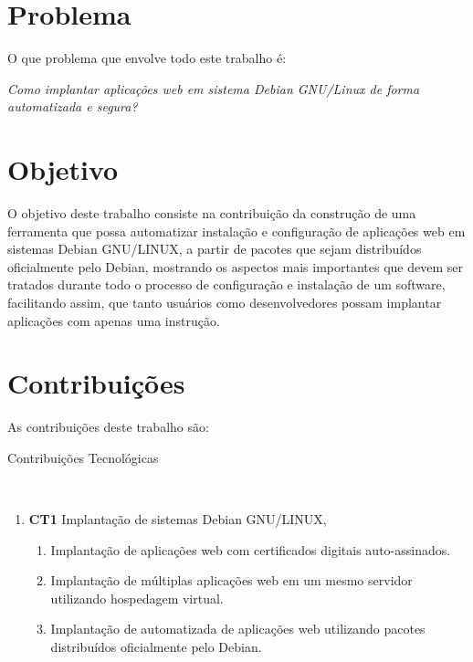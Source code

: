 \section{Problema}

O que problema que envolve todo este trabalho é:

\begin{center}
  \textit{
  Como implantar aplicações web em sistema Debian GNU/Linux de forma automatizada
  e segura?
}
\end{center}

\section{Objetivo}

O objetivo deste trabalho consiste na contribuição da construção de uma ferramenta
que possa automatizar instalação e configuração de aplicações web em sistemas
Debian GNU/LINUX, a partir de pacotes que sejam distribuídos oficialmente pelo
Debian, mostrando os aspectos mais importantes que devem ser tratados durante
todo o processo de configuração e instalação de um software, facilitando assim, que
tanto usuários como desenvolvedores possam implantar aplicações com apenas uma
instrução.

\section{Contribuições}

As contribuições deste trabalho são:

\begin{description}
  \item [Contribuições Tecnológicas]\
\end{description}
    \begin{enumerate}
      \item \textbf{CT1} Implantação de sistemas Debian GNU/LINUX,
        \begin{enumerate}
          \item Implantação de aplicações web com certificados digitais auto-assinados.
          \item Implantação de múltiplas aplicações web em um mesmo servidor utilizando
          hospedagem virtual.
          \item Implantação de automatizada de aplicações web utilizando pacotes
          distribuídos oficialmente pelo Debian.
        \end{enumerate}
    \end{enumerate}

